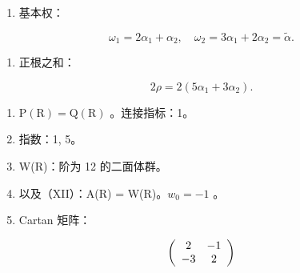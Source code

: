 \begin{enumerate}
\def\labelenumi{(\Roman{enumi})}
\setcounter{enumi}{5}
\tightlist
\item
  基本权：
\end{enumerate}

\[
\omega_ {1} = 2 \alpha_ {1} + \alpha_ {2}, \quad \omega_ {2} = 3 \alpha_ {1} + 2 \alpha_ {2} = \tilde {\alpha}.
\]

\begin{enumerate}
\def\labelenumi{(\Roman{enumi})}
\setcounter{enumi}{6}
\tightlist
\item
  正根之和：
\end{enumerate}

\[
2 \rho = 2 (5 \alpha_ {1} + 3 \alpha_ {2}).
\]

\begin{enumerate}
\def\labelenumi{(\Roman{enumi})}
\setcounter{enumi}{7}
\item
  \(\mathrm{P}(\mathrm{R}) = \mathrm{Q}(\mathrm{R})\) 。连接指标：1。
\item
  指数：1, 5。
\item
  W(R)：阶为 12 的二面体群。
\item
  以及（XII）：A(R) = W(R)。\(w_{0} = -1\) 。
\item
  Cartan 矩阵：
\end{enumerate}

\[
\left( \begin{array}{c c} 2 & - 1 \\ - 3 & 2 \end{array} \right)
\]

